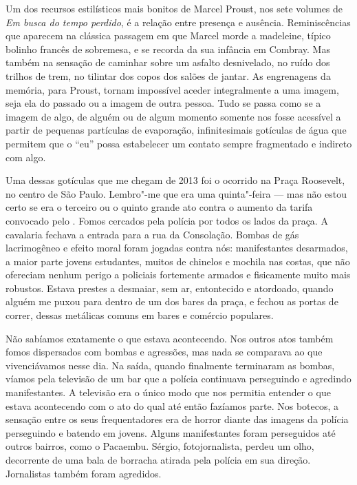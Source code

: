 Um dos recursos estilísticos mais bonitos de Marcel Proust, nos sete
volumes de \emph{Em busca do tempo perdido}, é a relação entre presença
e ausência. Reminiscências que aparecem na clássica passagem em que
Marcel morde a madeleine, típico bolinho francês de sobremesa, e se recorda da sua infância em Combray. Mas
também na sensação de caminhar sobre um asfalto desnivelado, no
ruído dos trilhos de trem, no tilintar dos copos dos salões de jantar.
As engrenagens da memória, para Proust, tornam impossível aceder
integralmente a uma imagem, seja ela do passado ou a imagem de outra
pessoa. Tudo se passa como se a imagem de algo, de alguém ou de algum
momento somente nos fosse acessível a partir de pequenas partículas de
evaporação, infinitesimais gotículas de água que permitem que o ``eu''
possa estabelecer um contato sempre fragmentado e indireto com algo.

Uma dessas gotículas que me chegam de 2013 foi o ocorrido na Praça
Roosevelt, no centro de São Paulo. Lembro"-me que era uma quinta"-feira ---
mas não estou certo se era o terceiro ou o quinto grande ato contra o
aumento da tarifa convocado pelo . Fomos cercados pela polícia por
todos os lados da praça. A cavalaria fechava a entrada para a rua da
Consolação. Bombas de gás lacrimogêneo e efeito moral foram jogadas
contra nós: manifestantes desarmados, a maior parte jovens estudantes,
muitos de chinelos e mochila nas costas, que não ofereciam nenhum perigo
a policiais fortemente armados e fisicamente muito mais robustos. Estava
prestes a desmaiar, sem ar, entontecido e atordoado, quando alguém me
puxou para dentro de um dos bares da praça, e fechou as portas de
correr, dessas metálicas comuns em bares e comércio populares.

Não sabíamos exatamente o que estava acontecendo. Nos outros atos também
fomos dispersados com bombas e agressões, mas nada se comparava ao que
vivenciávamos nesse dia. Na saída, quando finalmente terminaram as
bombas, víamos pela televisão de um bar que a polícia continuava
perseguindo e agredindo manifestantes. A televisão era o único modo que
nos permitia entender o que estava acontecendo com o ato do qual até
então fazíamos parte. Nos botecos, a sensação
entre os seus frequentadores era de horror diante das imagens da polícia
perseguindo e batendo em jovens. Alguns manifestantes foram perseguidos
até outros bairros, como o Pacaembu. Sérgio, fotojornalista, perdeu um olho, decorrente
de uma bala de borracha atirada pela polícia em sua direção. Jornalistas
também foram agredidos.

